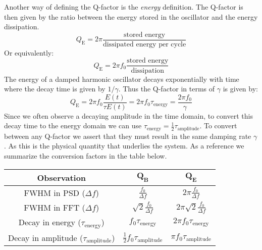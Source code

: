 Another way of defining the Q-factor is the \textit{energy} definition. The Q-factor is then given by the ratio between the energy stored in the oscillator and the energy dissipation.
\begin{equation}
    Q_\text{E} = 2 \pi \frac{\text{stored energy}}{\text{dissipated energy per cycle}}
\end{equation}
Or equivalently:
\begin{equation}
    Q_\text{E} = 2 \pi f_0 \frac{\text{stored energy}}{\text{dissipation}}
\end{equation}
The energy of a damped harmonic oscillator decays exponentially with time where the decay time is given by $1/\gamma$. Thus the Q-factor in terms of $\gamma$ is given by:
\begin{equation}
    Q_\text{E} = 2 \pi f_0 \frac{E(t)}{\tau E(t)} = 2 \pi f_0 \tau_\text{energy} = \frac{2\pi f_0}{\gamma}
\end{equation}
Since we often observe a decaying amplitude in the time domain, to convert this decay time to the energy domain we can use $\tau_\text{energy} = \frac{1}{2} \tau_\text{amplitude}$. To convert between any Q-factor we assert that they must result in the same damping rate $\gamma$. As this is the physical quantity that underlies the system. As a reference we summarize the conversion factors in the table below.

\begin{table}[h]
    \centering
    \begin{tabular}{ccc}
        \toprule
        \textbf{Observation} & $\bm{Q_B}$ & $\bm{Q_E}$ \\
        \midrule
        FWHM in PSD ($\Delta f$) & $\frac{f_0}{\Delta f}$ & $2\pi \frac{f_0}{\Delta f}$ \\
        FWHM in FFT ($\Delta f$) & $\sqrt{2} \frac{f_0}{\Delta f}$ & $2\pi \sqrt{2} \frac{f_0}{\Delta f}$ \\
        Decay in energy ($\tau_\text{energy}$) & $f_0 \tau_\text{energy}$ & $2 \pi f_0 \tau_\text{energy}$ \\
        Decay in amplitude ($\tau_\text{amplitude}$) & $\frac{1}{2} f_0 \tau_\text{amplitude}$ & $\pi f_0 \tau_\text{amplitude}$ \\
        \bottomrule
    \end{tabular}
\end{table}
